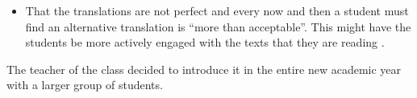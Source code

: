 \begin{itemize}
	\item That the translations are not perfect and every now and then a student must find an alternative translation is ``more than acceptable''. This might have the students be more actively engaged with the texts that they are reading . 


\end{itemize}


The teacher of the class decided to introduce it in the entire new academic year with a larger group of students. 
